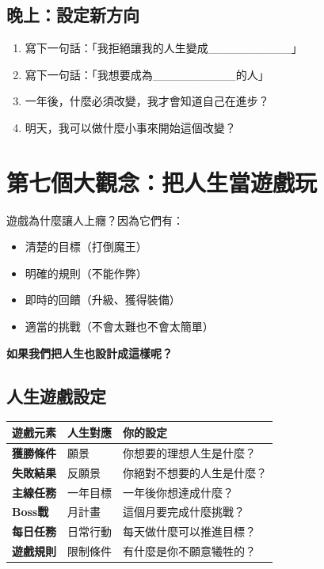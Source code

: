 \documentclass[12pt,a4paper]{article}
\begin{document}
\subsection{晚上：設定新方向}

\begin{enumerate}
    \item 寫下一句話：「我拒絕讓我的人生變成\_\_\_\_\_\_\_\_\_\_」
    \item 寫下一句話：「我想要成為\_\_\_\_\_\_\_\_\_\_的人」
    \item 一年後，什麼必須改變，我才會知道自己在進步？
    \item 明天，我可以做什麼小事來開始這個改變？
\end{enumerate}

\section{第七個大觀念：把人生當遊戲玩}

遊戲為什麼讓人上癮？因為它們有：
\begin{itemize}
    \item 清楚的目標（打倒魔王）
    \item 明確的規則（不能作弊）
    \item 即時的回饋（升級、獲得裝備）
    \item 適當的挑戰（不會太難也不會太簡單）
\end{itemize}

\textbf{如果我們把人生也設計成這樣呢？}

\subsection{人生遊戲設定}

\begin{longtable}{p{4cm}p{4cm}p{6cm}}
\toprule
\textbf{遊戲元素} & \textbf{人生對應} & \textbf{你的設定} \\
\midrule
\endfirsthead

\bottomrule
\endfoot

\textbf{獲勝條件} & 願景 & 你想要的理想人生是什麼？ \\
\midrule
\textbf{失敗結果} & 反願景 & 你絕對不想要的人生是什麼？ \\
\midrule
\textbf{主線任務} & 一年目標 & 一年後你想達成什麼？ \\
\midrule
\textbf{Boss戰} & 月計畫 & 這個月要完成什麼挑戰？ \\
\midrule
\textbf{每日任務} & 日常行動 & 每天做什麼可以推進目標？ \\
\midrule
\textbf{遊戲規則} & 限制條件 & 有什麼是你不願意犧牲的？ \\
\bottomrule
\end{longtable}
\end{document}
